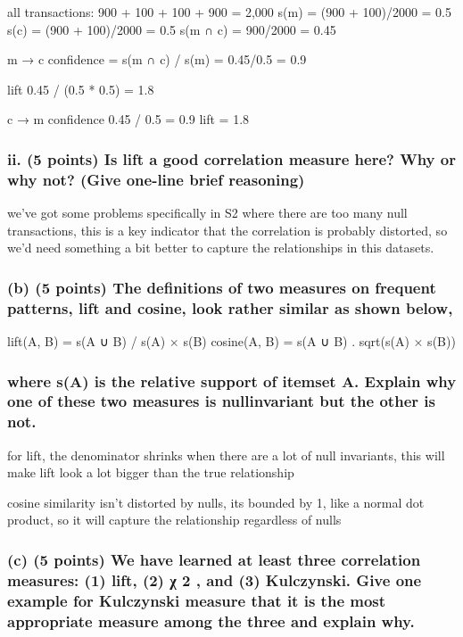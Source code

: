 \documentclass[
]{article}
\begin{document}
all transactions: 900 + 100 + 100 + 900 = 2,000 s(m) = (900 + 100)/2000
= 0.5 s(c) = (900 + 100)/2000 = 0.5 s(m ∩ c) = 900/2000 = 0.45

m → c confidence = s(m ∩ c) / s(m) = 0.45/0.5 = 0.9

lift 0.45 / (0.5 * 0.5) = 1.8

c → m confidence 0.45 / 0.5 = 0.9 lift = 1.8

\subsubsection{ii. (5 points) Is lift a good correlation measure here?
Why or why not? (Give one-line brief
reasoning)}\label{ii.-5-points-is-lift-a-good-correlation-measure-here-why-or-why-not-give-one-line-brief-reasoning}

we've got some problems specifically in S2 where there are too many null
transactions, this is a key indicator that the correlation is probably
distorted, so we'd need something a bit better to capture the
relationships in this datasets.

\subsubsection{(b) (5 points) The definitions of two measures on
frequent patterns, lift and cosine, look rather similar as shown
below,}\label{b-5-points-the-definitions-of-two-measures-on-frequent-patterns-lift-and-cosine-look-rather-similar-as-shown-below}

lift(A, B) = s(A ∪ B) / s(A) × s(B) cosine(A, B) = s(A ∪ B) . sqrt(s(A)
× s(B))

\subsubsection{where s(A) is the relative support of itemset A. Explain
why one of these two measures is nullinvariant but the other is
not.}\label{where-sa-is-the-relative-support-of-itemset-a.-explain-why-one-of-these-two-measures-is-nullinvariant-but-the-other-is-not.}

for lift, the denominator shrinks when there are a lot of null
invariants, this will make lift look a lot bigger than the true
relationship

cosine similarity isn't distorted by nulls, its bounded by 1, like a
normal dot product, so it will capture the relationship regardless of
nulls

\subsubsection{(c) (5 points) We have learned at least three correlation
measures: (1) lift, (2) χ 2 , and (3) Kulczynski. Give one example for
Kulczynski measure that it is the most appropriate measure among the
three and explain
why.}\label{c-5-points-we-have-learned-at-least-three-correlation-measures-1-lift-2-ux3c7-2-and-3-kulczynski.-give-one-example-for-kulczynski-measure-that-it-is-the-most-appropriate-measure-among-the-three-and-explain-why.}
\end{document}
